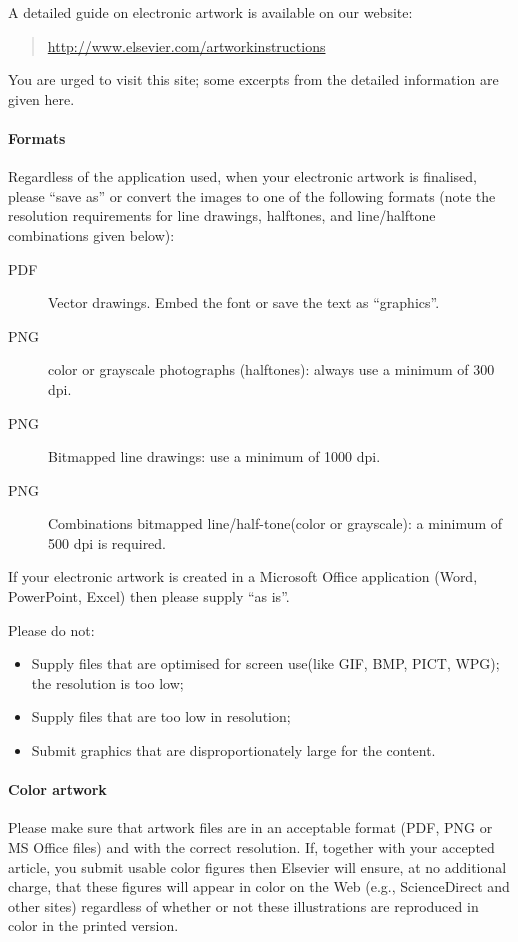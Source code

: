 \documentclass{cja}
\begin{document}
\begin{instructions}
  A detailed guide on electronic artwork is available on our website:
  \begin{quotation}
    \url{http://www.elsevier.com/artworkinstructions}
  \end{quotation}
  You are urged to visit this site; some excerpts from the detailed information are given here.

  \paragraph{Formats}
  Regardless of the application used, when your electronic artwork is finalised, please ``save as'' or convert the images to one of the following formats
  (note the resolution requirements for line drawings, halftones, and line/halftone combinations given below):
  \begin{description}
    \item[PDF] Vector drawings. Embed the font or save the text as ``graphics''.
    \item[PNG] color or grayscale photographs (halftones): always use a minimum of 300 dpi.
    \item[PNG] Bitmapped line drawings: use a minimum of 1000 dpi.
    \item[PNG] Combinations bitmapped line/half-tone(color or grayscale): a minimum of 500 dpi is required.
  \end{description}

  If your electronic artwork is created in a Microsoft Office application (Word, PowerPoint, Excel) then please supply ``as is''.

  Please do not:
  \begin{itemize}
    \item Supply files that are optimised for screen use(like GIF, BMP, PICT, WPG); the resolution is too low;
    \item Supply files that are too low in resolution;
    \item Submit graphics that are disproportionately large for the content.
  \end{itemize}

  \paragraph{Color artwork}
  Please make sure that artwork files are in an acceptable format (PDF, PNG or MS Office files) and with the correct resolution.
  If, together with your accepted article, you submit usable color figures then Elsevier will ensure, at no additional charge, that these figures will appear in color on the Web (e.g., ScienceDirect and other sites) regardless of whether or not these illustrations are reproduced in color in the printed version.
\end{instructions}
\end{document}
